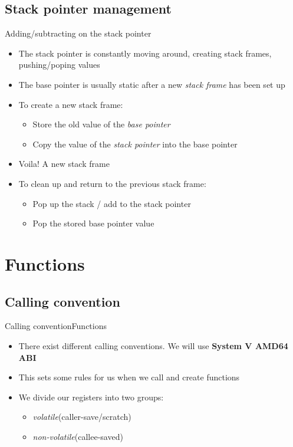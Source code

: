 \documentclass[
	11pt, %
	aspectratio=169, %
]{beamer}
\begin{document}
\subsection{Stack pointer management}
\begin{frame}{Adding/subtracting on the stack pointer}{\sectiontitle}
    \begin{itemize}
        \item The stack pointer is constantly moving around, creating stack frames, pushing/poping values
        \item The base pointer is usually static after a new \textit{stack frame} has been set up
        \item To create a new stack frame:
              \begin{itemize}
                  \item Store the old value of the \textit{base pointer}
                  \item Copy the value of the \textit{stack pointer} into the base pointer
              \end{itemize}
        \item Voila! A new stack frame
        \item To clean up and return to the previous stack frame:
              \begin{itemize}
                  \item Pop up the stack / add to the stack pointer
                  \item Pop the stored base pointer value
              \end{itemize}
    \end{itemize}
\end{frame}

\section{Functions}
\def \sectiontitle {Functions}
\subsection{Calling convention}
\begin{frame}{Calling convention}{\sectiontitle}
    \begin{itemize}
        \item There exist different calling conventions. We will use \textbf{System V AMD64 ABI}
        \item This sets some rules for us when we call and create functions
        \item We divide our registers into two groups:
              \begin{itemize}
                  \item \textit{volatile}(caller-save/scratch)
                  \item \textit{non-volatile}(callee-saved)
              \end{itemize}
    \end{itemize}
\end{frame}
\end{document}
